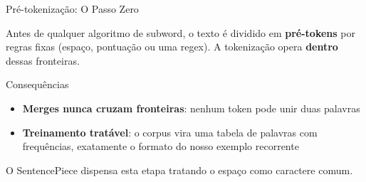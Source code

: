 \documentclass[aspectratio=169,xcolor=dvipsnames]{beamer}
\newcommand{\tok}[1]{\fcolorbox{pucrsblue}{lightblue}{\strut\textcolor{black}{\texttt{#1}}}}
\begin{document}
\begin{frame}{Pré-tokenização: O Passo Zero}

Antes de qualquer algoritmo de subword, o texto é dividido em \textbf{pré-tokens} por regras fixas (espaço, pontuação ou uma regex). A tokenização opera \textbf{dentro} dessas fronteiras.

\vspace{6pt}

\centering
{}

\vspace{6pt}

\begin{block}{Consequências}
\begin{itemize}
    \item \textbf{Merges nunca cruzam fronteiras}: nenhum token pode unir duas palavras
    \item \textbf{Treinamento tratável}: o corpus vira uma tabela de palavras com frequências, exatamente o formato do nosso exemplo recorrente\end{itemize}
\end{block}

\vspace{4pt}

{\footnotesize O SentencePiece dispensa esta etapa tratando o espaço como caractere comum.}

\end{frame}

\end{document}
